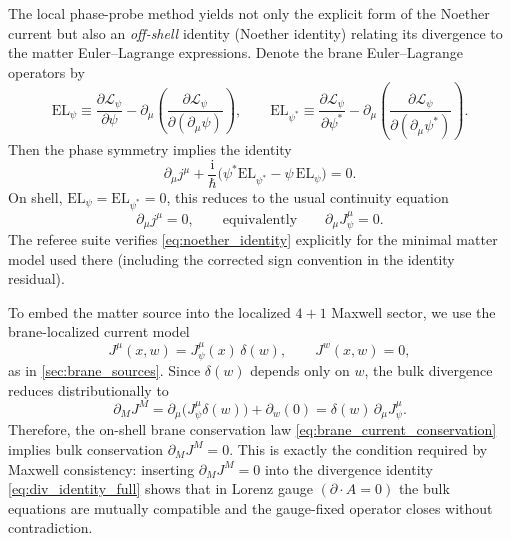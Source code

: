 \documentclass[11pt]{article}
\newcommand{\ii}{\mathrm i}
\newcommand{\A}{A}
\newcommand{\J}{J}
\newcommand{\Jpsi}{J_\psi}
\begin{document}
The local phase-probe method yields not only the explicit form of the Noether
current but also an \emph{off-shell} identity (Noether identity) relating its
divergence to the matter Euler--Lagrange expressions. Denote the brane
Euler--Lagrange operators by
\begin{equation}
  \mathrm{EL}_{\psi} \equiv \frac{\partial\mathcal L_\psi}{\partial \psi}
  -\partial_\mu\!\left(\frac{\partial\mathcal L_\psi}{\partial(\partial_\mu\psi)}\right),
  \qquad
  \mathrm{EL}_{\psi^*} \equiv \frac{\partial\mathcal L_\psi}{\partial \psi^*}
  -\partial_\mu\!\left(\frac{\partial\mathcal L_\psi}{\partial(\partial_\mu\psi^*)}\right).
\end{equation}
Then the phase symmetry implies the identity
\begin{equation}
  \partial_\mu j^\mu
  + \frac{\ii}{\hbar}\Big(\psi^*\mathrm{EL}_{\psi^*}-\psi\,\mathrm{EL}_{\psi}\Big)
  = 0.
  \label{eq:noether_identity}
\end{equation}
On shell, \(\mathrm{EL}_\psi=\mathrm{EL}_{\psi^*}=0\), this reduces to the usual
continuity equation
\begin{equation}
  \partial_\mu j^\mu = 0,
  \qquad\text{equivalently}\qquad
  \partial_\mu \Jpsi^\mu = 0.
  \label{eq:brane_current_conservation}
\end{equation}
The referee suite verifies \cref{eq:noether_identity} explicitly for the minimal
matter model used there (including the corrected sign convention in the identity
residual).

To embed the matter source into the localized \(4+1\) Maxwell sector, we use the
brane-localized current model
\begin{equation}
  \J^\mu(x,w) = \Jpsi^\mu(x)\,\delta(w),
  \qquad
  \J^w(x,w)=0,
  \label{eq:J_bulk_from_brane}
\end{equation}
as in \cref{sec:brane_sources}. Since \(\delta(w)\) depends only on \(w\), the
bulk divergence reduces distributionally to
\begin{equation}
  \partial_M \J^M
  = \partial_\mu\!\big(\Jpsi^\mu\delta(w)\big)
    + \partial_w(0)
  = \delta(w)\,\partial_\mu \Jpsi^\mu.
\end{equation}
Therefore, the on-shell brane conservation law \cref{eq:brane_current_conservation}
implies bulk conservation \(\partial_M\J^M=0\). This is exactly the condition
required by Maxwell consistency: inserting \(\partial_M\J^M=0\) into the
divergence identity \cref{eq:div_identity_full} shows that in Lorenz gauge
\((\partial\!\cdot\!\A=0)\) the bulk equations are mutually compatible and the
gauge-fixed operator closes without contradiction.
\end{document}
